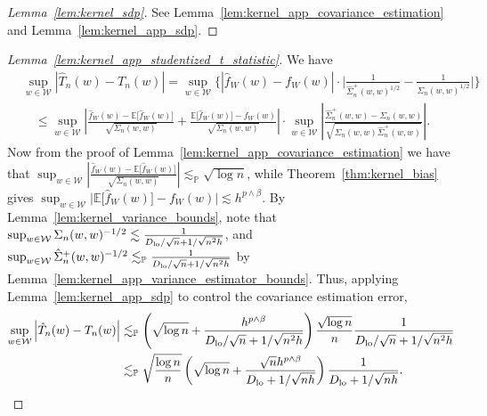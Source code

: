\documentclass[11pt,lof]{puthesis}
\renewcommand{\P}{\ensuremath{\mathbb{P}}}
\newcommand{\E}{\ensuremath{\mathbb{E}}}
\newcommand{\cW}{\ensuremath{\mathcal{W}}}
\newcommand{\Dl}{\ensuremath{D_{\textup{lo}}}}
\theoremstyle{break}
\theoremstyle{proof}
\newtheorem{proof}{Proof}
\begin{document}
\begin{proof}[Lemma~\ref{lem:kernel_sdp}]
  See Lemma~\ref{lem:kernel_app_covariance_estimation}
  and Lemma~\ref{lem:kernel_app_sdp}.
\end{proof}

\begin{proof}[Lemma~\ref{lem:kernel_app_studentized_t_statistic}]
  We have
  \begin{align*}
    &\sup_{w \in \cW}
    \left| \hat T_n(w) - T_n(w) \right|
    =
    \sup_{w \in \cW}
    \bigg\{
      \left|
      \hat f_W(w) - f_W(w)
      \right|
      \cdot
      \bigg|
      \frac{1}
      {\hat\Sigma_n^+(w,w)^{1/2}}
      -
      \frac{1}{\Sigma_n(w,w)^{1/2}}
      \bigg|
    \bigg\} \\
    &\quad\leq
    \sup_{w \in \cW}
    \left|
    \frac{\hat f_W(w) - \E\big[\hat f_W(w)\big]}
    {\sqrt{\Sigma_n(w,w)}}
    + \frac{\E\big[\hat f_W(w)\big] - f_W(w)}
    {\sqrt{\Sigma_n(w,w)}}
    \right|
    \cdot \sup_{w \in \cW}
    \left|
    \frac{\hat\Sigma_n^+(w,w) - \Sigma_n(w,w)}
    {\sqrt{\Sigma_n(w,w) \hat\Sigma_n^+(w,w)}}
    \right|.
  \end{align*}
  Now from the proof of Lemma~\ref{lem:kernel_app_covariance_estimation} we
  have that
  $\sup_{w \in \cW} \left|
  \frac{\hat f_W(w) - \E\big[\hat f_W(w)\big]}
  {\sqrt{\Sigma_n(w,w)}} \right|
  \lesssim_\P \sqrt{\log n}$,
  while Theorem~\ref{thm:kernel_bias} gives
  $\sup_{w \in \cW} \big| \E\big[\hat f_W(w)\big] - f_W(w) \big|
  \lesssim h^{p \wedge \beta}$.
  By Lemma~\ref{lem:kernel_variance_bounds},
  note that
  $\sup_{w \in \cW} \Sigma_n(w,w)^{-1/2}
  \lesssim \frac{1}{\Dl/\sqrt{n} + 1/\sqrt{n^2h}}$, and
  $\sup_{w \in \cW} \hat \Sigma_n^+(w,w)^{-1/2}
  \lesssim_\P \frac{1}{\Dl/\sqrt{n} + 1/\sqrt{n^2h}}$
  by Lemma~\ref{lem:kernel_app_variance_estimator_bounds}.
  Thus, applying Lemma~\ref{lem:kernel_app_sdp} to control the
  covariance estimation error,
  \begin{align*}
    \sup_{w \in \cW}
    \left| \hat T_n(w) - T_n(w) \right|
    &\lesssim_\P
    \left(
      \sqrt{\log n} + \frac{h^{p \wedge \beta}}{\Dl/\sqrt{n} + 1/\sqrt{n^2h}}
    \right)
    \frac{\sqrt{\log n}}{n}
    \frac{1}{\Dl/\sqrt{n} + 1/\sqrt{n^2h}} \\
    &\lesssim_\P
    \sqrt{\frac{\log n}{n}}
    \left(
      \sqrt{\log n} + \frac{\sqrt n h^{p \wedge \beta}}
      {\Dl + 1/\sqrt{n h}}
    \right)
    \frac{1}{\Dl + 1/\sqrt{n h}}.
  \end{align*}
\end{proof}
\end{document}
